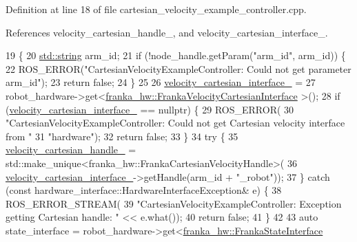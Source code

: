 Definition at line 18 of file cartesian\+\_\+velocity\+\_\+example\+\_\+controller.\+cpp.



References velocity\+\_\+cartesian\+\_\+handle\+\_\+, and velocity\+\_\+cartesian\+\_\+interface\+\_\+.


\begin{DoxyCode}
19                                                                           \{
20   \hyperlink{namespacetesting_1_1internal_a8e8ff5b11e64078831112677156cb111}{std::string} arm\_id;
21   \textcolor{keywordflow}{if} (!node\_handle.getParam(\textcolor{stringliteral}{"arm\_id"}, arm\_id)) \{
22     ROS\_ERROR(\textcolor{stringliteral}{"CartesianVelocityExampleController: Could not get parameter arm\_id"});
23     \textcolor{keywordflow}{return} \textcolor{keyword}{false};
24   \}
25 
26   \hyperlink{classfranka__example__controllers_1_1CartesianVelocityExampleController_a252b7cc51863ad43fe4fb01bd07c6947}{velocity\_cartesian\_interface\_} =
27       robot\_hardware->get<\hyperlink{classfranka__hw_1_1FrankaVelocityCartesianInterface}{franka\_hw::FrankaVelocityCartesianInterface}
      >();
28   \textcolor{keywordflow}{if} (\hyperlink{classfranka__example__controllers_1_1CartesianVelocityExampleController_a252b7cc51863ad43fe4fb01bd07c6947}{velocity\_cartesian\_interface\_} == \textcolor{keyword}{nullptr}) \{
29     ROS\_ERROR(
30         \textcolor{stringliteral}{"CartesianVelocityExampleController: Could not get Cartesian velocity interface from "}
31         \textcolor{stringliteral}{"hardware"});
32     \textcolor{keywordflow}{return} \textcolor{keyword}{false};
33   \}
34   \textcolor{keywordflow}{try} \{
35     \hyperlink{classfranka__example__controllers_1_1CartesianVelocityExampleController_a70d748ed0786497d2ca847e011c237c9}{velocity\_cartesian\_handle\_} = 
      std::make\_unique<franka\_hw::FrankaCartesianVelocityHandle>(
36         \hyperlink{classfranka__example__controllers_1_1CartesianVelocityExampleController_a252b7cc51863ad43fe4fb01bd07c6947}{velocity\_cartesian\_interface\_}->getHandle(arm\_id + \textcolor{stringliteral}{"\_robot"}));
37   \} \textcolor{keywordflow}{catch} (\textcolor{keyword}{const} hardware\_interface::HardwareInterfaceException& e) \{
38     ROS\_ERROR\_STREAM(
39         \textcolor{stringliteral}{"CartesianVelocityExampleController: Exception getting Cartesian handle: "} << e.what());
40     \textcolor{keywordflow}{return} \textcolor{keyword}{false};
41   \}
42 
43   \textcolor{keyword}{auto} state\_interface = robot\_hardware->get<\hyperlink{classfranka__hw_1_1FrankaStateInterface}{franka\_hw::FrankaStateInterface}

\end{DoxyCode}
